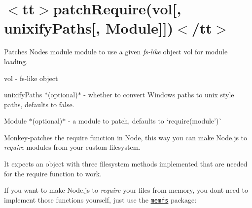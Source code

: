\chapter{\texorpdfstring{$<$}{<}tt\texorpdfstring{$>$}{>}patch\+Require(vol\mbox{[}, unixify\+Paths\mbox{[}, Module\mbox{]}\mbox{]})\texorpdfstring{$<$}{<}/tt\texorpdfstring{$>$}{>}}
\hypertarget{md_pkiclassroomrescheduler_2src_2main_2frontend_2node__modules_2fs-monkey_2docs_2api_2patch_require}{}\label{md_pkiclassroomrescheduler_2src_2main_2frontend_2node__modules_2fs-monkey_2docs_2api_2patch_require}
\label{md_pkiclassroomrescheduler_2src_2main_2frontend_2node__modules_2fs-monkey_2docs_2api_2patch_require_autotoc_md13085}%
%
 Patches Node\textquotesingle{}s {\ttfamily module} module to use a given {\itshape fs-\/like} object {\ttfamily vol} for module loading.


\begin{DoxyItemize}
\item {\ttfamily vol} -\/ fs-\/like object
\item {\ttfamily unixify\+Paths} \texorpdfstring{$\ast$}{*}(optional)\texorpdfstring{$\ast$}{*} -\/ whether to convert Windows paths to unix style paths, defaults to {\ttfamily false}.
\item {\ttfamily Module} \texorpdfstring{$\ast$}{*}(optional)\texorpdfstring{$\ast$}{*} -\/ a module to patch, defaults to `require(\textquotesingle{}module')\`{}
\end{DoxyItemize}

Monkey-\/patches the {\ttfamily require} function in Node, this way you can make Node.\+js to {\itshape require} modules from your custom filesystem.

It expects an object with three filesystem methods implemented that are needed for the {\ttfamily require} function to work.


\begin{DoxyCode}{0}
\DoxyCodeLine{\};}

\end{DoxyCode}


If you want to make Node.\+js to {\itshape require} your files from memory, you don\textquotesingle{}t need to implement those functions yourself, just use the \href{https://github.com/streamich/memfs}{\texttt{ {\ttfamily memfs}}} package\+:


